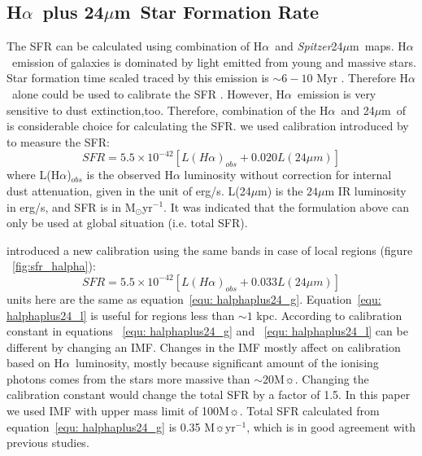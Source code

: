 \documentclass[useAMS,usenatbib]{mn2e}
\newcommand \halpha    {H$\alpha $\ }
\newcommand \um    {$\mu$m\ }
\newcommand \Spitzer {{\it Spitzer}}
\begin{document}
\subsection{\halpha plus 24\um Star Formation Rate}
\label{sec:sfr_halpha}

The SFR can be calculated using combination of \halpha and \Spitzer  24\um maps. \halpha emission of galaxies is dominated by light emitted from young and massive stars. Star formation time scaled traced by this emission is $\sim 6-10$ Myr \citep[e.g.,][]{Kennicutt09, Calzetti12}. Therefore \halpha alone could be used to calibrate the SFR \citep[e.g.,][]{Osterbrock06, Kennicutt09}. However, \halpha emission is very sensitive to dust extinction,too. Therefore, combination of the \halpha and 24\um of is considerable choice for calculating the SFR. we used calibration introduced by \cite{Kennicutt09} to measure the SFR:
\begin{equation}
\label{equ: halphaplus24_g}
SFR = 5.5 \times 10^{-42}[L(H{\alpha})_{obs} + 0.020L(24\mu m)]
\end{equation}
where L(H${\alpha}$)$_{obs}$ is the observed H${\alpha}$ luminosity without correction for internal dust attenuation, given in the unit of erg/s. L(24$\mu$m) is the $24\mu$m IR luminosity in erg/s, and SFR is in M$_{\odot}$yr$^{-1}$. It was indicated that the formulation above can only be used at global situation (i.e. total SFR).

\cite{Calzetti07} introduced a new calibration using the same bands in case of local regions (figure ~\ref{fig:sfr_halpha}):
\begin{equation}
\label{equ: halphaplus24_l}
SFR = 5.5 \times 10^{-42}[L(H{\alpha})_{obs} + 0.033L(24\mu m)]
\end{equation}
units here are the same as equation~\ref{equ: halphaplus24_g}. Equation~\ref{equ: halphaplus24_l} is useful for regions less than $\sim 1$ kpc. According to  \cite{Calzetti07} calibration constant in equations ~\ref{equ: halphaplus24_g} and ~\ref{equ: halphaplus24_l} can be different by changing an IMF. Changes in the IMF mostly affect on calibration based on \halpha luminosity, mostly because significant amount of the ionising photons comes from the stars more massive than $\sim 20$M$\sun$. Changing the calibration constant would change the total SFR by a factor of 1.5. In this paper we used \cite{Kroupa01} IMF with upper mass limit of 100M$\sun$. Total SFR calculated from equation~\ref{equ: halphaplus24_g} is 0.35  M$\sun$yr$^{-1}$, which is in good agreement with previous studies.
\end{document}
